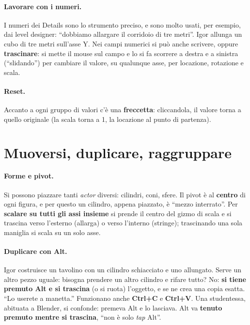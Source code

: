 \paragraph{Lavorare con i numeri.} I numeri dei Details sono lo strumento preciso, e
sono molto usati, per esempio, dai level designer: ``dobbiamo allargare il corridoio di
tre metri''. Igor allunga un cubo di tre metri sull'asse Y. Nei campi numerici si può
anche scrivere, oppure \textbf{trascinare}: si mette il mouse sul campo e lo si fa
scorrere a destra e a sinistra (``slidando'') per cambiare il valore, su qualunque asse,
per locazione, rotazione e scala.

\paragraph{Reset.} Accanto a ogni gruppo di valori c'è una \textbf{freccetta}: cliccandola,
il valore torna a quello originale (la scala torna a 1, la locazione al punto di
partenza).

\section{Muoversi, duplicare, raggruppare}
\label{ue1:sec:navigazione}

\paragraph{Forme e pivot.} Si possono piazzare tanti \emph{actor} diversi: cilindri,
coni, sfere. Il pivot è al \textbf{centro} di ogni figura, e per questo un cilindro,
appena piazzato, è ``mezzo interrato''. Per \textbf{scalare su tutti gli assi
insieme} si prende il centro del gizmo di scala e si trascina verso l'esterno (allarga)
o verso l'interno (stringe); trascinando una sola maniglia si scala su un solo asse.

\paragraph{Duplicare con Alt.} Igor costruisce un tavolino con un cilindro schiacciato e
uno allungato. Serve un altro pezzo uguale: bisogna prendere un altro cilindro e rifare
tutto? No: \textbf{si tiene premuto Alt e si trascina} (o si ruota) l'oggetto, e se ne
crea una copia esatta. ``Lo userete a manetta.'' Funzionano anche \textbf{Ctrl+C} e
\textbf{Ctrl+V}. Una studentessa, abituata a Blender, si confonde: premeva Alt e lo
lasciava. Alt va \textbf{tenuto premuto mentre si trascina}, ``non è solo \emph{tap}
Alt''.

